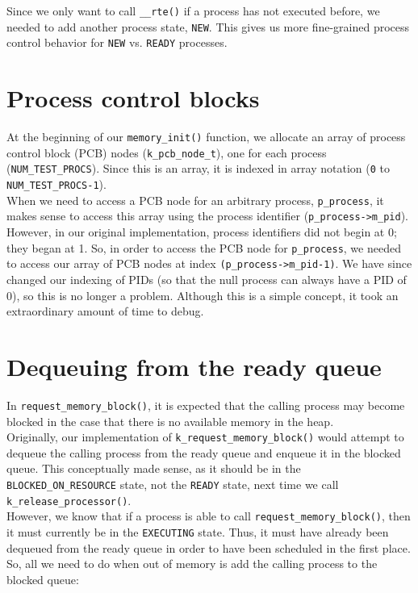 \documentclass[12pt]{report}
\begin{document}
Since we only want to call \texttt{__rte()} if a process has not executed before, we needed to add another process state, \texttt{NEW}. This gives us more fine-grained process control behavior for \texttt{NEW} vs. \texttt{READY} processes.

\section{Process control blocks}

At the beginning of our \texttt{memory_init()} function, we allocate an array of process control block (PCB) nodes (\texttt{k_pcb_node_t}), one for each process (\texttt{NUM_TEST_PROCS}). Since this is an array, it is indexed in array notation (\texttt{0} to \texttt{NUM_TEST_PROCS-1}).\\

When we need to access a PCB node for an arbitrary process, \texttt{p_process}, it makes sense to access this array using the process identifier (\texttt{p_process->m_pid}). However, in our original implementation, process identifiers did not begin at 0; they began at 1. So, in order to access the PCB node for \texttt{p_process}, we needed to access our array of PCB nodes at index \texttt{(p_process->m_pid-1)}. We have since changed our indexing of PIDs (so that the null process can always have a PID of 0), so this is no longer a problem. Although this is a simple concept, it took an extraordinary amount of time to debug.

\section{Dequeuing from the ready queue}

In \texttt{request_memory_block()}, it is expected that the calling process may become blocked in the case that there is no available memory in the heap.\\

Originally, our implementation of \texttt{k_request_memory_block()} would attempt to dequeue the calling process from the ready queue and enqueue it in the blocked queue. This conceptually made sense, as it should be in the \texttt{BLOCKED_ON_RESOURCE} state, not the \texttt{READY} state, next time we call \texttt{k_release_processor()}.\\

However, we know that if a process is able to call \texttt{request_memory_block()}, then it must currently be in the \texttt{EXECUTING} state. Thus, it must have already been dequeued from the ready queue in order to have been scheduled in the first place. So, all we need to do when out of memory is add the calling process to the blocked queue:
\end{document}
